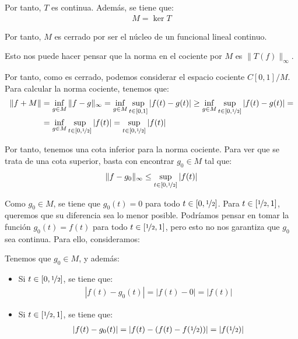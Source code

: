 \begin{ejercicio}
\begin{description}
    Por tanto, $T$ es continua. Además, se tiene que:
    \begin{align*}
        M = \ker T
    \end{align*}

    Por tanto, $M$ es cerrado por ser el núcleo de un funcional lineal continuo.
    \begin{observacion}
        Esto nos puede hacer pensar que la norma en el cociente por $M$ es $\|T(f)\|_{\infty}$.
    \end{observacion}
\end{description}

Por tanto, como es cerrado, podemos considerar el espacio cociente $C[0, 1] / M$. Para calcular la norma cociente, tenemos que:
\begin{align*}
    \|f + M\| &= \inf\limits_{g \in M} \|f - g\|_\infty = \inf\limits_{g \in M} \sup\limits_{t \in [0, 1]} |f(t) - g(t)|
    \geq \inf\limits_{g \in M} \sup\limits_{t \in [0, \nicefrac{1}{2}]} |f(t) - g(t)| =\\&= \inf\limits_{g \in M} \sup\limits_{t \in [0, \nicefrac{1}{2}]} |f(t)| = \sup\limits_{t \in [0, \nicefrac{1}{2}]} |f(t)|
\end{align*}

Por tanto, tenemos una cota inferior para la norma cociente. Para ver que se trata de una cota superior, basta con encontrar $g_0\in M$ tal que:
\begin{equation*}
    \|f - g_0\|_\infty \leq \sup\limits_{t \in [0, \nicefrac{1}{2}]} |f(t)|
\end{equation*}

Como $g_0\in M$, se tiene que $g_0(t) = 0$ para todo $t \in [0, \nicefrac{1}{2}]$. Para $t \in [\nicefrac{1}{2}, 1]$, queremos que su diferencia sea lo menor posible. Podríamos pensar en tomar la función $g_0(t) = f(t)$ para todo $t \in [\nicefrac{1}{2}, 1]$, pero esto no nos garantiza que $g_0$ sea continua. Para ello, consideramos:

Tenemos que $g_0\in M$, y además:
\begin{itemize}
    \item Si $t \in [0, \nicefrac{1}{2}]$, se tiene que:
    \begin{align*}
        |f(t) - g_0(t)| = |f(t) - 0| = |f(t)|
    \end{align*}
    \item Si $t \in [\nicefrac{1}{2}, 1]$, se tiene que:
    \begin{align*}
        |f(t) - g_0(t)| = |f(t) - (f(t) - f(\nicefrac{1}{2}))| = |f(\nicefrac{1}{2})|
    \end{align*}
\end{itemize}


\end{ejercicio}
